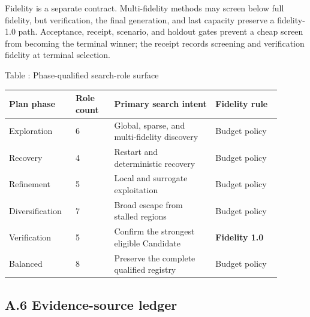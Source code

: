 Fidelity is a separate contract. Multi-fidelity methods may screen below
full fidelity, but verification, the final generation, and last capacity
preserve a fidelity-1.0 path. Acceptance, receipt, scenario, and holdout
gates prevent a cheap screen from becoming the terminal winner; the
receipt records screening and verification fidelity at terminal
selection.

\begin{center}
\begingroup
\footnotesize
\renewcommand{\arraystretch}{0.94}
\textnormal{Table \thetable: Phase-qualified search-role surface}\par
\vspace{0.18em}
\begin{tabular}{@{}L{0.21\linewidth}C{0.13\linewidth}L{0.34\linewidth}L{0.22\linewidth}@{}}
\toprule
\textbf{Plan phase} & \textbf{Role count} & \textbf{Primary search intent} &
\textbf{Fidelity rule}\tabularnewline
\midrule
Exploration & 6 & Global, sparse, and multi-fidelity discovery &
Budget policy\tabularnewline
Recovery & 4 & Restart and deterministic recovery &
Budget policy\tabularnewline
Refinement & 5 & Local and surrogate exploitation &
Budget policy\tabularnewline
Diversification & 7 & Broad escape from stalled regions &
Budget policy\tabularnewline
Verification & 5 & Confirm the strongest eligible Candidate &
\textbf{Fidelity 1.0}\tabularnewline
Balanced & 8 & Preserve the complete qualified registry &
Budget policy\tabularnewline
\bottomrule
\end{tabular}
\endgroup
\end{center}

\subsection{\texorpdfstring{\textbf{A.6 Evidence-source
ledger}}{A.6 Evidence-source ledger}}\label{a.6-evidence-source-ledger}

